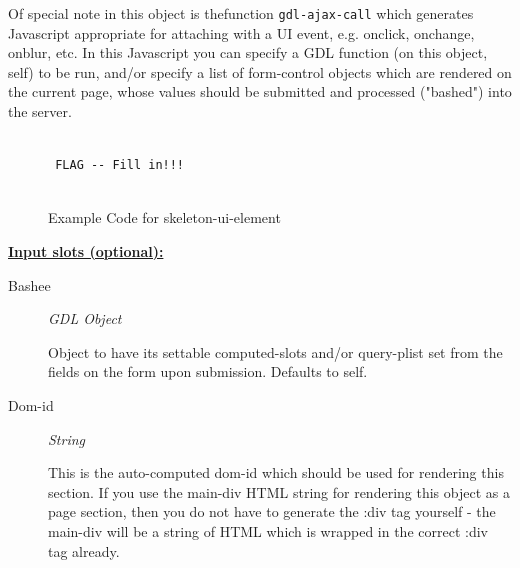 \documentclass [11pt]{book}
\begin{document}
\begin{itemize}
\begin{description}
Of special note in this object is thefunction \texttt{gdl-ajax-call} which generates 
Javascript appropriate for attaching with a UI event, e.g. onclick, onchange, 
onblur, etc. In this Javascript you can specify a GDL function (on this object, self) 
to be run, and/or specify a list of form-control objects which are rendered on 
the current page, whose values should be submitted and processed ("bashed") into the 
server.



\end{description}




\begin{figure}
\begin{lrbox}{\boxedverb}
\begin{minipage}{\linewidth}
{\small

\begin{verbatim}

 FLAG -- Fill in!!!


\end{verbatim}}
\end{minipage}
\end{lrbox}
\fbox{\usebox{\boxedverb}}

\caption{Example Code for skeleton-ui-element}

\label{fig:example-code-skeleton-ui-element}

\end{figure}





\textbf{
\underline{Input slots (optional):}}

\begin{description}

\item [Bashee]
\emph{GDL Object}

 Object to have its settable computed-slots and/or query-plist set
from the fields on the form upon submission. Defaults to self.




\item [Dom-id]
\emph{String}

 This is the auto-computed dom-id which should be used for rendering
this section. If you use the main-div HTML string for rendering this object as a
page section, then you do not have to generate the :div tag yourself - the main-div
will be a string of HTML which is wrapped in the correct :div tag already.





\end{description}
\end{itemize}
\end{document}
